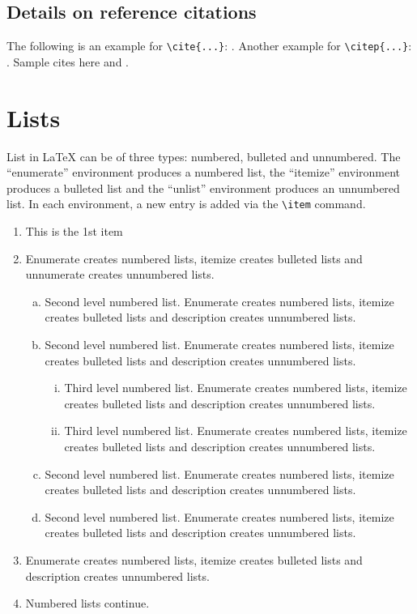 \documentclass[namedate,webpdf,contemporary,large]{TBench-template}%
\theoremstyle{thmstyleone}%
\theoremstyle{thmstyletwo}%
\theoremstyle{thmstylethree}%
\begin{document}
\subsection{Details on reference citations}\label{subsec3}



\noindent
The following is an example for \verb+\cite{...}+: \cite{haque2025llms}. Another example for \verb+\citep{...}+: \citep{krishnapriya2025hybrid,murphy2012machine,ji20123d}.
Sample cites here \cite{krizhevsky2012imagenet} and \cite{lecun2015deep,ravi2016deep,woods2005open}.


\section{Lists}\label{sec9}

List in \LaTeX{} can be of three types: numbered, bulleted and unnumbered. The ``enumerate'' environment produces a numbered list, the 
``itemize'' environment produces a bulleted list and the ``unlist''
environment produces an unnumbered list.
In each environment, a new entry is added via the \verb+\item+ command.
\begin{enumerate}[1.]
\item This is the 1st item

\item Enumerate creates numbered lists, itemize creates bulleted lists and
unnumerate creates unnumbered lists.
\begin{enumerate}[(a)]
\item Second level numbered list. Enumerate creates numbered lists, itemize creates bulleted lists and
description creates unnumbered lists.

\item Second level numbered list. Enumerate creates numbered lists, itemize creates bulleted lists and
description creates unnumbered lists.
\begin{enumerate}[(ii)]
\item Third level numbered list. Enumerate creates numbered lists, itemize creates bulleted lists and
description creates unnumbered lists.

\item Third level numbered list. Enumerate creates numbered lists, itemize creates bulleted lists and
description creates unnumbered lists.
\end{enumerate}

\item Second level numbered list. Enumerate creates numbered lists, itemize creates bulleted lists and
description creates unnumbered lists.

\item Second level numbered list. Enumerate creates numbered lists, itemize creates bulleted lists and
description creates unnumbered lists.
\end{enumerate}

\item Enumerate creates numbered lists, itemize creates bulleted lists and
description creates unnumbered lists.

\item Numbered lists continue.
\end{enumerate}
\end{document}
